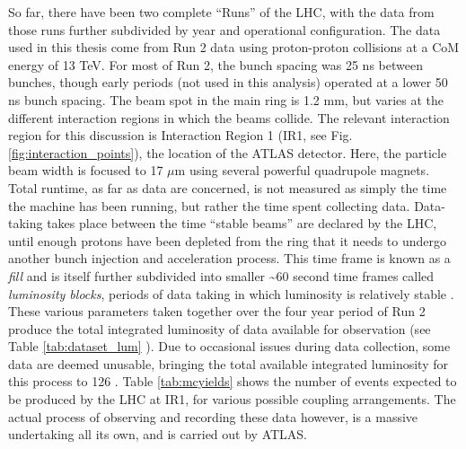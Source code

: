     

    So far, there have been two complete ``Runs'' of the LHC, with the data from those runs further subdivided by year and operational configuration.
    The data used in this thesis come from Run 2 data using proton-proton collisions at a CoM energy of 13 TeV.
    For most of Run 2, the bunch spacing was 25 ns between bunches, though early periods (not used in this analysis) operated at a lower 50 ns bunch spacing.
    The beam spot in the main ring is 1.2 mm, but varies at the different interaction regions in which the beams collide.
    The relevant interaction region for this discussion is Interaction Region 1 (IR1, see Fig. \ref{fig:interaction_points}), the location of the ATLAS detector.
    Here, the particle beam width is focused to 17 $\mu$m\cite{lhc_run2} using several powerful quadrupole magnets.
    Total runtime, as far as data are concerned,
        is not measured as simply the time the machine has been running,
        but rather the time spent collecting data.
    Data-taking takes place between the time ``stable beams'' are declared by the LHC, until enough protons have been depleted from the ring that it needs to undergo another bunch injection and acceleration process.
    This time frame is known as a \textit{fill}
        and is itself further subdivided into smaller \textasciitilde 60 second time frames called \textit{luminosity blocks},
        periods of data taking in which luminosity is relatively stable \cite{data_quality}.
    These various parameters taken together over the four year period of Run 2 produce the total integrated luminosity of data available for observation (see Table \ref{tab:dataset_lum} ).
    Due to occasional issues during data collection, some data are deemed unusable,
        bringing the total available integrated luminosity for this process to 126 \ifb.
    Table \ref{tab:mcyields} shows the number of \vbfhhproc events expected to be produced by the LHC at IR1,
        for various possible coupling arrangements.
    The actual process of observing and recording these data however, is a massive undertaking all its own, and is carried out by ATLAS.
